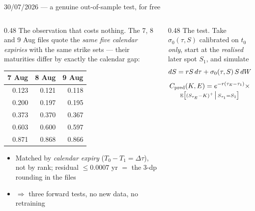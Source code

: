 \documentclass[aspectratio=169,11pt]{beamer}
\newcommand{\gold}[1]{{\color{ntugold}#1}}
\newcommand{\red}[1]{{\color{ntured}#1}}
\begin{document}

\begin{frame}[shrink=10]{30/07/2026 --- a genuine out-of-sample test, for free}
  \begin{columns}[T]
    \begin{column}{0.48\linewidth}
      \gold{The observation that costs nothing.} The 7, 8 and 9 Aug files quote the
      \emph{same five calendar expiries} with the same strike sets --- their maturities
      differ by exactly the calendar gap:
      \begin{center}\tiny
      \begin{tabular}{rrr}
        \toprule
        7 Aug & 8 Aug & 9 Aug \\
        \midrule
        0.123 & 0.121 & 0.118 \\
        0.200 & 0.197 & 0.195 \\
        0.373 & 0.370 & 0.367 \\
        0.603 & 0.600 & 0.597 \\
        0.871 & 0.868 & 0.866 \\
        \bottomrule
      \end{tabular}
      \end{center}
      \begin{itemize}\scriptsize
        \item Matched by \emph{calendar expiry} ($T_0-T_1=\Delta\tau$), not by rank;
              residual $\le0.0007$ yr $=$ the 3-dp rounding in the files
        \item $\Rightarrow$ three forward tests, \red{no new data, no retraining}
      \end{itemize}
    \end{column}
    \begin{column}{0.48\linewidth}
      \gold{The test.} Take $\sigma_0(\tau,S)$ calibrated on $t_0$ \emph{only}, start at
      the \emph{realised} later spot $S_1$, and simulate
      \[\scriptsize
        dS = rS\,d\tau + \sigma_0(\tau,S)\,S\,dW
      \]
      \vspace{-0.35cm}
      \begin{gather*}\scriptsize
        C_{\rm pred}(K,E)=e^{-r(\tau_E-\tau_1)}\times\\[-0.1cm]
        \scriptstyle
        \mathbb E\big[(S_{\tau_E}-K)^+\,\big|\,S_{\tau_1}=S_1\big]
      \end{gather*}

\end{column}
\end{columns}
\end{frame}
\end{document}
